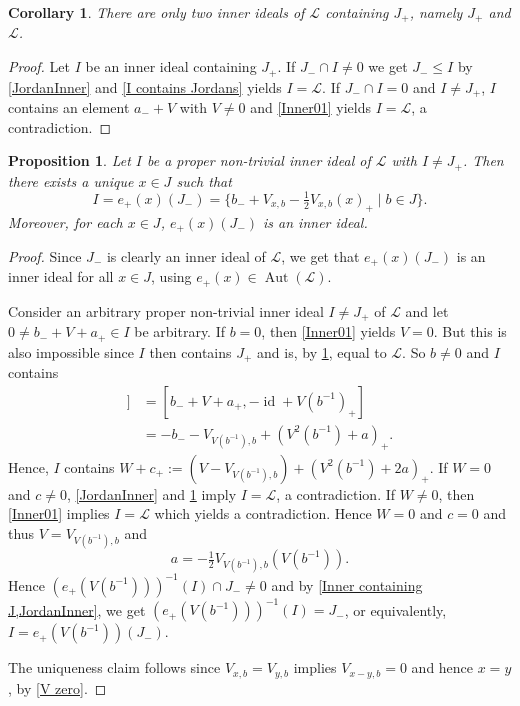 \documentclass[oneside,a4paper]{amsart} %
\newtheorem{proposition}[theorem]{Proposition}
\newtheorem{corollary}[theorem]{Corollary}
\theoremstyle{definition}
\DeclareMathOperator{\Aut}{Aut}
\DeclareMathOperator{\id}{id}
\newcommand{\LL}{\mathcal{L}}
\numberwithin{equation}{section}
\begin{document}
\begin{corollary}
\label{Inner containing J}
	There are only two inner ideals of $\LL$ containing $J_+$, namely $J_+$ and $\LL$.
\end{corollary}
\begin{proof}
	Let $I$ be an inner ideal containing $J_+$.
	If $J_-\cap I\neq 0$ we get $J_-\leq I$ by \cref{JordanInner} and \cref{I contains Jordans} yields $I=\LL$.
	If $J_-\cap I=0$ and $I\neq J_+$, $I$ contains an element $a_-+V$ with $V\neq 0$ and \cref{Inner01} yields $I=\LL$, a contradiction.
\end{proof}

\begin{proposition}
\label{Set Inner ideals}
	Let $I$ be a proper non-trivial inner ideal of $\LL$ with $I \neq J_+$.
	Then there exists a unique $x\in J$ such that
	\[ I = e_+(x)(J_-) = \bigl\{ b_-+V_{x,b}-\tfrac{1}{2}V_{x,b}(x)_+ \mid b\in J \bigr\} . \] 
	Moreover, for each $x \in J$, $e_+(x)(J_-)$ is an inner ideal.
\end{proposition}
\begin{proof}
	Since $J_-$ is clearly an inner ideal of $\LL$, we get that $e_+(x)(J_-)$ is an inner ideal for all $x\in J$, using $e_+(x)\in\Aut (\LL)$.
	
	Consider an arbitrary proper non-trivial inner ideal $I\neq J_+$ of $\LL$ and let $0\neq b_-+V+a_+\in I$ be arbitrary.
	If $b=0$, then \cref{Inner01} yields $V=0$.
	But this is also impossible since $I$ then contains $J_+$ and is, by \cref{Inner containing J}, equal to $\LL$.
	So $b\neq 0$ and $I$ contains
	\begin{align*}
	 [b_-+V+a_+,[b_-+V+a_+,b^{-1}_+]]&=[b_-+V+a_+,-\id+V(b^{-1})_+]\\
	 &=-b_--V_{V(b^{-1}),b}+(V^2(b^{-1})+a)_+ .
	\end{align*}
	Hence, $I$ contains $W+c_+:=(V-V_{V(b^{-1}),b})+(V^2(b^{-1})+2a)_+$.
	If $W=0$ and $c\neq 0$, \cref{JordanInner} and \cref{Inner containing J} imply $I=\LL$, a contradiction.
	If $W\neq 0$, then \cref{Inner01} implies $I=\LL$ which yields a contradiction.
	Hence $W=0$ and $c=0$ and thus $V=V_{V(b^{-1}),b}$ and 
	\[
	a=-\tfrac{1}{2}V_{V(b^{-1}),b}(V(b^{-1})) .
	\]
	Hence $(e_+(V(b^{-1})))^{-1}(I)\cap J_- \neq 0$ and by \cref{Inner containing J,JordanInner}, we get $(e_+(V(b^{-1})))^{-1}(I)=J_-$, or equivalently, $I=e_+(V(b^{-1}))(J_-)$.
	
	The uniqueness claim follows since $V_{x,b}=V_{y,b}$ implies $V_{x-y,b}=0$ and hence $x=y$, by \cref{V zero}.
\end{proof}
\end{document}
